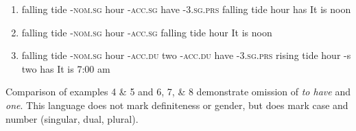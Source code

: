 \documentclass{article}
\begin{document}
\begin{enumerate}
    \item 
		{{falling tide} -\textsc{nom.sg} hour -\textsc{acc.sg} have -\textsc{3.sg.prs}}
		{{falling tide} {} hour {} has {}}
		{It is noon}
     \item 
		{{falling tide} -\textsc{nom.sg} hour -\textsc{acc.sg} }
		{{falling tide} {} hour {} }
		{It is noon}
    \item 
		{{falling tide} -\textsc{nom.sg} hour -\textsc{acc.du} two -\textsc{acc.du}  have -\textsc{3.sg.prs} }
		{{rising tide} {} hour -s two {} has {} }
		{It is 7:00 am}
\end{enumerate}

Comparison of examples 4 \& 5 and 6, 7, \& 8 demonstrate omission of \textit{to have} and \textit{one}.  This language does not mark definiteness or gender, but does mark case and number (singular, dual, plural).
\end{document}
